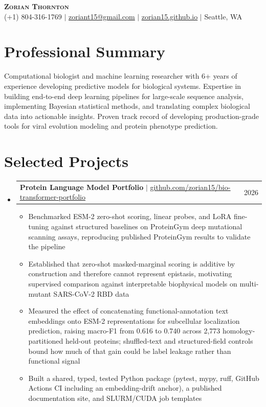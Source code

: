 \documentclass[letterpaper,11pt]{article}
\makeatletter
\newcommand{\resumeItem}[1]{
  \item\small{
    {#1 \vspace{-2pt}}
  }
}
\newcommand{\resumeProjectHeading}[2]{
    \item
    \begin{tabular*}{0.97\textwidth}{l@{\extracolsep{\fill}}r}
      \small#1 & #2 \\
    \end{tabular*}\vspace{-7pt}
}
\newcommand{\resumeSubHeadingListStart}{\begin{itemize}[leftmargin=0.15in, label={}]}
\newcommand{\resumeSubHeadingListEnd}{\end{itemize}}
\newcommand{\resumeItemListStart}{\begin{itemize}}
\newcommand{\resumeItemListEnd}{\end{itemize}\vspace{-5pt}}
\makeatother
\begin{document}
\begin{center}
    \textbf{\Huge \scshape Zorian Thornton} \\ \vspace{1pt}
    \small (+1) 804-316-1769 $|$ \href{mailto:zoriant15@gmail.com}{\underline{zoriant15@gmail.com}} $|$
    \href{https://zorian15.github.io}{\underline{zorian15.github.io}} $|$ Seattle, WA
\end{center}

\section{Professional Summary}
\small{Computational biologist and machine learning researcher with 6+ years of experience developing predictive models for biological systems. Expertise in building end-to-end deep learning pipelines for large-scale sequence analysis, implementing Bayesian statistical methods, and translating complex biological data into actionable insights. Proven track record of developing production-grade tools for viral evolution modeling and protein phenotype prediction.}

\section{Selected Projects}
  \resumeSubHeadingListStart
    \resumeProjectHeading
      {\textbf{Protein Language Model Portfolio} $|$ \href{https://github.com/zorian15/bio-transformer-portfolio}{\underline{github.com/zorian15/bio-transformer-portfolio}}}{2026}
      \resumeItemListStart
        \resumeItem{Benchmarked ESM-2 zero-shot scoring, linear probes, and LoRA fine-tuning against structured baselines on ProteinGym deep mutational scanning assays, reproducing published ProteinGym results to validate the pipeline}
        \resumeItem{Established that zero-shot masked-marginal scoring is additive by construction and therefore cannot represent epistasis, motivating supervised comparison against interpretable biophysical models on multi-mutant SARS-CoV-2 RBD data}
        \resumeItem{Measured the effect of concatenating functional-annotation text embeddings onto ESM-2 representations for subcellular localization prediction, raising macro-F1 from 0.616 to 0.740 across 2,773 homology-partitioned held-out proteins; shuffled-text and structured-field controls bound how much of that gain could be label leakage rather than functional signal}
        \resumeItem{Built a shared, typed, tested Python package (pytest, mypy, ruff, GitHub Actions CI including an embedding-drift anchor), a published documentation site, and SLURM/CUDA job templates}
      \resumeItemListEnd
  \resumeSubHeadingListEnd
\end{document}
